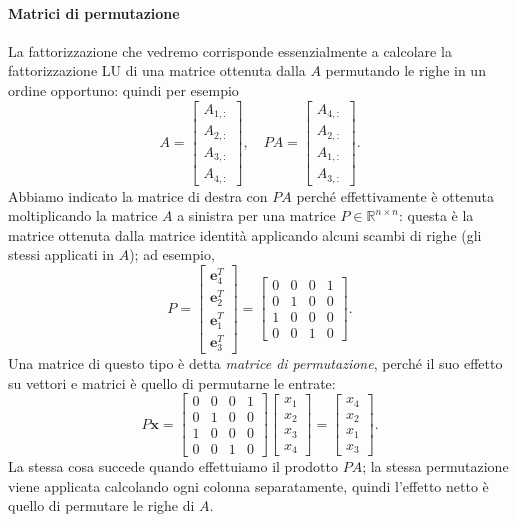 \documentclass[a4paper]{report}
\theoremstyle{definiton}
\theoremstyle{remark}
\newcommand{\x}{\mathbf{x}}
\begin{document}
\paragraph{Matrici di permutazione}
La fattorizzazione che vedremo corrisponde essenzialmente a calcolare la fattorizzazione LU di una matrice ottenuta dalla $A$ permutando le righe in un ordine opportuno: quindi per esempio
\[
A = \begin{bmatrix}
    A_{1,:} \\
    A_{2,:} \\
    A_{3,:} \\
    A_{4,:}
\end{bmatrix}, \quad
PA = \begin{bmatrix}
    A_{4,:}\\
    A_{2,:}\\
    A_{1,:}\\
    A_{3,:}
\end{bmatrix}.
\]
Abbiamo indicato la matrice di destra con $PA$ perché effettivamente è ottenuta moltiplicando la matrice $A$ a sinistra per una matrice $P\in\mathbb{R}^{n\times n}$: questa è la matrice ottenuta dalla matrice identità applicando alcuni scambi di righe (gli stessi applicati in $A$); ad esempio,
\[
P = 
\begin{bmatrix}
    \mathbf{e}_4^T\\
    \mathbf{e}_2^T\\
    \mathbf{e}_1^T\\
    \mathbf{e}_3^T
\end{bmatrix}
=
\begin{bmatrix}
    0 & 0 & 0 & 1\\
    0 & 1 & 0 & 0\\
    1 & 0 & 0 & 0\\
    0 & 0 & 1 & 0
\end{bmatrix}.
\]
Una matrice di questo tipo è detta \emph{matrice di permutazione}, perché il suo effetto su vettori e matrici è quello di permutarne le entrate:
\[
P\mathbf{x}
=
\begin{bmatrix}
    0 & 0 & 0 & 1\\
    0 & 1 & 0 & 0\\
    1 & 0 & 0 & 0\\
    0 & 0 & 1 & 0
\end{bmatrix}
\begin{bmatrix}
    x_1\\x_2\\x_3\\x_4
\end{bmatrix} = \begin{bmatrix}
    x_4\\x_2\\x_1\\x_3
\end{bmatrix}.
\]
La stessa cosa succede quando effettuiamo il prodotto $PA$; la stessa permutazione viene applicata calcolando ogni colonna separatamente, quindi l'effetto netto è quello di permutare le righe di $A$.
\end{document}
